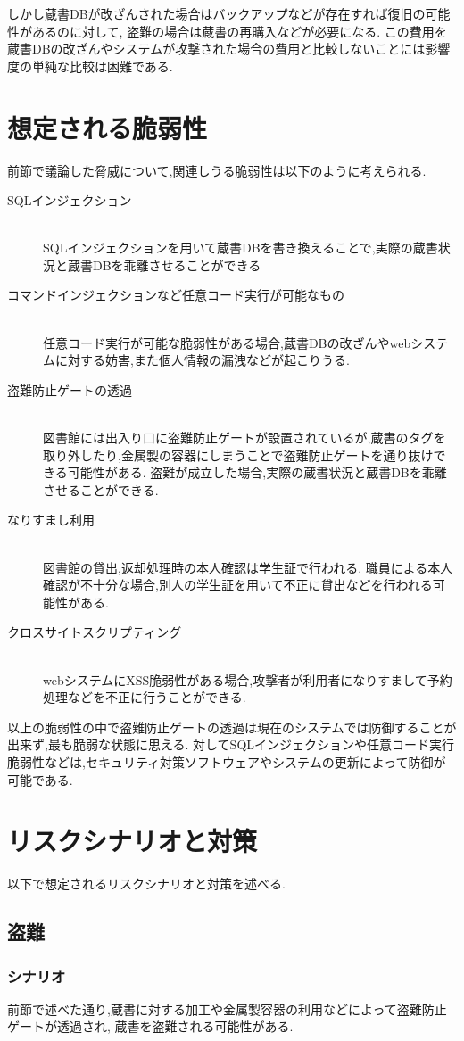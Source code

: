 \documentclass[uplatex,a4j,11pt,dvipdfmx]{jsarticle}
\begin{document}
しかし蔵書DBが改ざんされた場合はバックアップなどが存在すれば復旧の可能性があるのに対して,
盗難の場合は蔵書の再購入などが必要になる.
この費用を蔵書DBの改ざんやシステムが攻撃された場合の費用と比較しないことには影響度の単純な比較は困難である.
\section{想定される脆弱性}
前節で議論した脅威について,関連しうる脆弱性は以下のように考えられる.
\begin{description}
  \item [SQLインジェクション]\mbox{}\\
  SQLインジェクションを用いて蔵書DBを書き換えることで,実際の蔵書状況と蔵書DBを乖離させることができる
  \item [コマンドインジェクションなど任意コード実行が可能なもの]\mbox{}\\
  任意コード実行が可能な脆弱性がある場合,蔵書DBの改ざんやwebシステムに対する妨害,また個人情報の漏洩などが起こりうる.
  \item [盗難防止ゲートの透過]\mbox{}\\
  図書館には出入り口に盗難防止ゲートが設置されているが,蔵書のタグを取り外したり,金属製の容器にしまうことで盗難防止ゲートを通り抜けできる可能性がある.
  盗難が成立した場合,実際の蔵書状況と蔵書DBを乖離させることができる.
  \item [なりすまし利用]\mbox{}\\
  図書館の貸出,返却処理時の本人確認は学生証で行われる.
  職員による本人確認が不十分な場合,別人の学生証を用いて不正に貸出などを行われる可能性がある.
  \item [クロスサイトスクリプティング]\mbox{}\\
  webシステムにXSS脆弱性がある場合,攻撃者が利用者になりすまして予約処理などを不正に行うことができる.
\end{description}
以上の脆弱性の中で盗難防止ゲートの透過は現在のシステムでは防御することが出来ず,最も脆弱な状態に思える.
対してSQLインジェクションや任意コード実行脆弱性などは,セキュリティ対策ソフトウェアやシステムの更新によって防御が可能である.
\section{リスクシナリオと対策}
以下で想定されるリスクシナリオと対策を述べる.
\subsection{盗難}
\subsubsection{シナリオ}
前節で述べた通り,蔵書に対する加工や金属製容器の利用などによって盗難防止ゲートが透過され,
蔵書を盗難される可能性がある.
\end{document}
